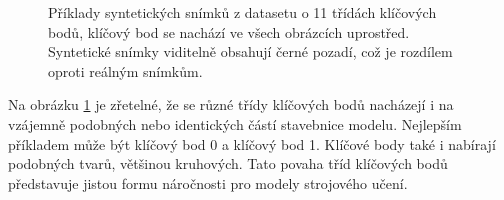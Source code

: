 \begin{figure}[htbp]
\hspace{\hspacesize}%
\hspace{\hspacesize}%
\subfloat{%
  \hspace{\imagewidth}
}

\caption[Příklady syntetických snímků z datasetu]{Příklady syntetických snímků z datasetu o 11 třídách klíčových bodů, klíčový bod se nachází ve všech obrázcích uprostřed. Syntetické snímky viditelně obsahují černé pozadí, což je rozdílem oproti reálným snímkům. }
\label{fig:synthetic_images}
\end{figure}

Na obrázku \ref{fig:synthetic_images} je zřetelné, že se různé třídy klíčových bodů nacházejí i na vzájemně podobných nebo identických částí stavebnice modelu. Nejlepším příkladem může být klíčový bod 0 a klíčový bod 1. Klíčové body také i nabírají podobných tvarů, většinou kruhových. Tato povaha tříd klíčových bodů představuje jistou formu náročnosti pro modely strojového učení.

\endinput
